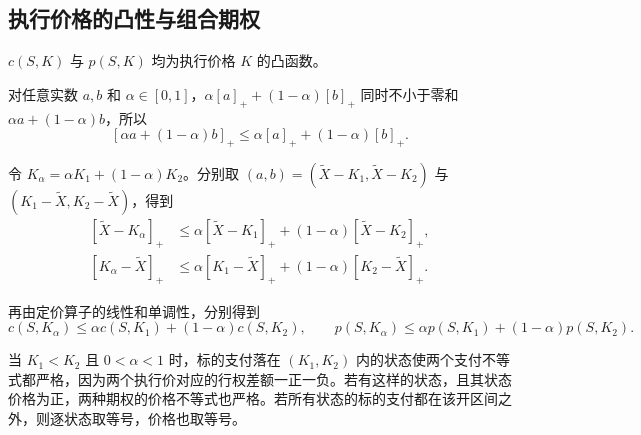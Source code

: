 \subsection{执行价格的凸性与组合期权}
\begin{tcolorbox}[knowledge]
$c(S,K)$ 与 $p(S,K)$ 均为执行价格 $K$ 的凸函数。
\end{tcolorbox}
\begin{solution}[label-content={证明},blank-type=none]
对任意实数 $a,b$ 和 $\alpha\in[0,1]$，$\alpha[a]_++(1-\alpha)[b]_+$ 同时不小于零和 $\alpha a+(1-\alpha)b$，所以
\[
 [\alpha a+(1-\alpha)b]_+\le\alpha[a]_++(1-\alpha)[b]_+.
\]

令 $K_\alpha=\alpha K_1+(1-\alpha)K_2$。分别取 $(a,b)=(\tilde X-K_1,\tilde X-K_2)$ 与 $(K_1-\tilde X,K_2-\tilde X)$，得到
\[
 \begin{aligned}
 [\tilde X-K_\alpha]_+&\le\alpha[\tilde X-K_1]_++(1-\alpha)[\tilde X-K_2]_+,\\
 [K_\alpha-\tilde X]_+&\le\alpha[K_1-\tilde X]_++(1-\alpha)[K_2-\tilde X]_+.
 \end{aligned}
\]

再由定价算子的线性和单调性，分别得到
\[
 c(S,K_\alpha)\le\alpha c(S,K_1)+(1-\alpha)c(S,K_2),\qquad
 p(S,K_\alpha)\le\alpha p(S,K_1)+(1-\alpha)p(S,K_2).
\]
\end{solution}


当 $K_1<K_2$ 且 $0<\alpha<1$ 时，标的支付落在 $(K_1,K_2)$ 内的状态使两个支付不等式都严格，因为两个执行价对应的行权差额一正一负。若有这样的状态，且其状态价格为正，两种期权的价格不等式也严格。若所有状态的标的支付都在该开区间之外，则逐状态取等号，价格也取等号。


